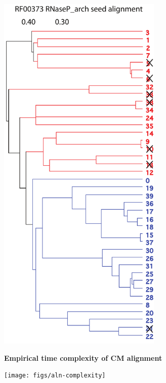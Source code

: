 \documentclass[landscape]{slides}
\begin{document}
\begin{slide}
\begin{minipage}{3.5in}
\begin{center}
\includegraphics[height=7in]{figs/u8-RF00373-tree}

\end{center}
\end{minipage}
\end{slide}
%
\begin{slide}
\begin{center}
\textbf{Empirical time complexity of CM alignment}

\texttt{[image: figs/aln-complexity]}

\vfill
\end{center}
\end{slide}
\end{document}
